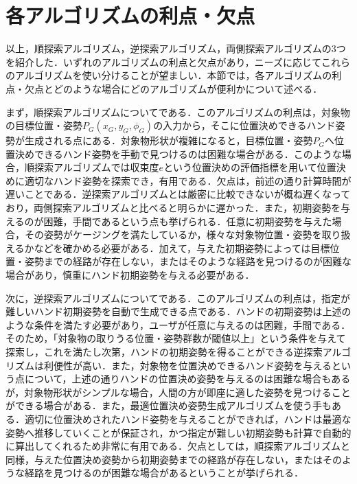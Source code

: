 \documentclass[a4paper,twoside,12pt,papersize, dvipdfmx]{iirthesis}
\begin{document}
\section{各アルゴリズムの利点・欠点}
以上，順探索アルゴリズム，逆探索アルゴリズム，両側探索アルゴリズムの3つを紹介した．いずれのアルゴリズムの利点と欠点があり，ニーズに応じてこれらのアルゴリズムを使い分けることが望ましい．本節では，各アルゴリズムの利点・欠点とどのような場合にどのアルゴリズムが便利かについて述べる．\par

まず，順探索アルゴリズムについてである．このアルゴリズムの利点は，対象物の目標位置・姿勢$P_{G} (x_{G}, y_{G}, \phi_{G})$の入力から，そこに位置決めできるハンド姿勢が生成される点にある．対象物形状が複雑になると，目標位置・姿勢$P_G$へ位置決めできるハンド姿勢を手動で見つけるのは困難な場合がある．このような場合，順探索アルゴリズムでは収束度$e$という位置決めの評価指標を用いて位置決めに適切なハンド姿勢を探索でき，有用である．欠点は，前述の通り計算時間が遅いことである．逆探索アルゴリズムとは厳密に比較できないが概ね遅くなっており，両側探索アルゴリズムと比べると明らかに遅かった．また，初期姿勢を与えるのが困難，手間であるという点も挙げられる．任意に初期姿勢を与えた場合，その姿勢がケージングを満たしているか，様々な対象物位置・姿勢を取り扱えるかなどを確かめる必要がある．加えて，与えた初期姿勢によっては目標位置・姿勢までの経路が存在しない，またはそのような経路を見つけるのが困難な場合があり，慎重にハンド初期姿勢を与える必要がある．\par

次に，逆探索アルゴリズムについてである．このアルゴリズムの利点は，指定が難しいハンド初期姿勢を自動で生成できる点である．ハンドの初期姿勢は上述のような条件を満たす必要があり，ユーザが任意に与えるのは困難，手間である．そのため，「対象物の取りうる位置・姿勢群数が閾値以上」という条件を与えて探索し，これを満たし次第，ハンドの初期姿勢を得ることができる逆探索アルゴリズムは利便性が高い．また，対象物を位置決めできるハンド姿勢を与えるという点について，上述の通りハンドの位置決め姿勢を与えるのは困難な場合もあるが，対象物形状がシンプルな場合，人間の方が即座に適した姿勢を見つけることができる場合がある．また，最適位置決め姿勢生成アルゴリズムを使う手もある．適切に位置決めされたハンド姿勢を与えることができれば，ハンドは最適な姿勢へ推移していくことが保証され，かつ指定が難しい初期姿勢も計算で自動的に算出してくれるため非常に有用である．欠点としては，順探索アルゴリズムと同様，与えた位置決め姿勢から初期姿勢までの経路が存在しない，またはそのような経路を見つけるのが困難な場合があるということが挙げられる．\par
\end{document}
